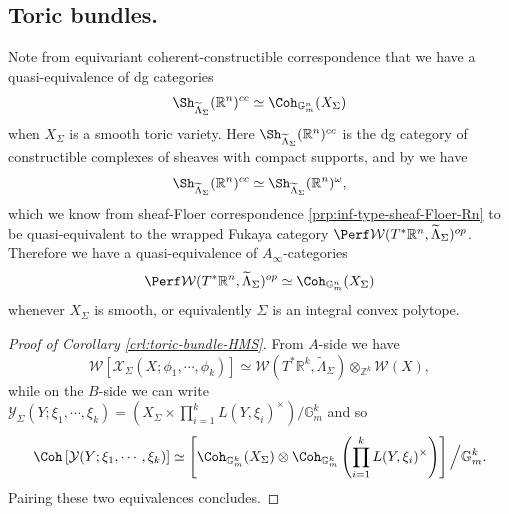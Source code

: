\subsection{Toric bundles.} Note from equivariant coherent-constructible correspondence \cite{FLTZ11} that we have a quasi-equivalence of dg categories \[
    \Sh_{\widetilde{\Lambda}_{\Sigma}} (\mathbb{R}^n)^{cc}\simeq\Coh_{\mathbb{G}_m^n} (X_{\Sigma})
\]when $X_{\Sigma}$ is a smooth toric variety.
Here $\Sh_{\widetilde{\Lambda}_{\Sigma}} (\mathbb{R}^n)^{cc}$ is the dg category of constructible complexes of sheaves with compact supports, and by \cite[Lemma 4.18]{GPS24M} we have \[
    \Sh_{\widetilde{\Lambda}_{\Sigma}} (\mathbb{R}^n)^{cc}\simeq\Sh_{\widetilde{\Lambda}_{\Sigma}} (\mathbb{R}^n)^{\omega},
\]which we know from sheaf-Floer correspondence \ref{prp:inf-type-sheaf-Floer-Rn} to be quasi-equivalent to the wrapped Fukaya category $\Perf\mathcal{W} (T^{\ast}\mathbb{R}^n,\widetilde{\Lambda}_{\Sigma})^{op}$.
Therefore we have a quasi-equivalence of $A_{\infty}$-categories \[
    \Perf\mathcal{W} (T^{\ast}\mathbb{R}^n,\widetilde{\Lambda}_{\Sigma})^{op}\simeq\Coh_{\mathbb{G}_m^n} (X_{\Sigma})
\]whenever $X_{\Sigma}$ is smooth, or equivalently $\Sigma$ is an integral convex polytope.
\begin{proof}[Proof of Corollary \ref{crl:toric-bundle-HMS}]
    From $A$-side we have \[
        \mathcal{W}\left[\mathcal{X}_{\Sigma} (X;\phi_1,\dotsb ,\phi_k)\right]\simeq\mathcal{W} (T^{\ast}\mathbb{R}^k,\widetilde{\Lambda}_{\Sigma})\otimes_{\mathbb{Z}^k}\mathcal{W} (X),
    \]while on the $B$-side we can write $\mathcal{Y}_{\Sigma} (Y;\xi_1,\dotsb ,\xi_k)=\left(X_{\Sigma}\times \prod_{i=1}^k L(Y,\xi_i)^{\times}\right)/\mathbb{G}_m^k$ and so \[
        \Coh\left[\mathcal{Y} (Y;\xi_1,\dotsb ,\xi_k)\right]\simeq\left[\Coh_{\mathbb{G}_m^k} (X_{\Sigma})\otimes\Coh_{\mathbb{G}_m^k} \left(\prod_{i=1}^kL(Y,\xi_i)^{\times}\right)\right]\Big/\mathbb{G}_m^k.
    \]Pairing these two equivalences concludes.
\end{proof}
